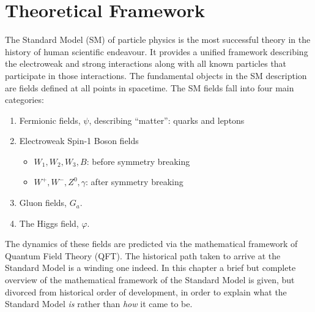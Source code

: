 \graphicspath{{Ch1_Theory/figures/}}

\chapter{Theoretical Framework}



% 

The Standard Model (SM) of particle physics is the most successful theory in the history of human scientific endeavour.
It provides a unified framework describing the electroweak and strong interactions along with all known particles that participate in those interactions.
The fundamental objects in the SM description are fields defined at all points in spacetime.
The SM fields fall into four main categories:


\begin{enumerate}
    \item Fermionic fields, $\psi$, describing ``matter'': quarks and leptons
    \item Electroweak Spin-1 Boson fields
        \begin{itemize}
            \item $W_1, W_2, W_3, B$: before symmetry breaking
            \item $W^+, W^-, Z^0, \gamma$: after symmetry breaking
        \end{itemize}
    \item Gluon fields, $G_a$.
    \item The Higgs field, $\varphi$.
\end{enumerate}

The dynamics of these fields are predicted via the mathematical framework of Quantum Field Theory (QFT).
The historical path taken to arrive at the Standard Model is a winding one indeed.
In this chapter a brief but complete overview of the mathematical framework of the Standard Model is given, but divorced from historical order of development, in order to explain what the Standard Model \textit{is} rather than \textit{how} it came to be.

